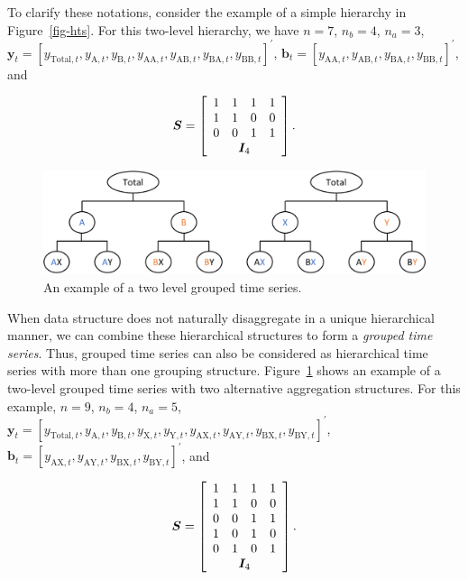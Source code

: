 \documentclass[11pt,a4paper,]{article}
\begin{document}
To clarify these notations, consider the example of a simple hierarchy
in Figure~\ref{fig-hts}. For this two-level hierarchy, we have
\(n = 7\), \(n_b = 4\), \(n_a = 3\),
\(\boldsymbol{y}_t = [y_{\text{Total},t}, y_{\text{A},t}, y_{\text{B},t}, y_{\text{AA},t}, y_{\text{AB},t}, y_{\text{BA},t}, y_{\text{BB},t}]^{\prime}\),
\(\boldsymbol{b}_t = [y_{\text{AA},t}, y_{\text{AB},t}, y_{\text{BA},t}, y_{\text{BB},t}]^{\prime}\),
and

\[
\boldsymbol{S} = \left[
\begin{array}{cccc}
1 & 1 & 1 & 1 \\
1 & 1 & 0 & 0 \\
0 & 0 & 1 & 1 \\
\multicolumn{4}{c}{\boldsymbol{I}_4}
\end{array}\right].
\]

\begin{figure}

{\centering \includegraphics[width=1\textwidth,height=\textheight]{figs/gts_example.pdf}

}

\caption{\label{fig-gts}An example of a two level grouped time series.}

\end{figure}

When data structure does not naturally disaggregate in a unique
hierarchical manner, we can combine these hierarchical structures to
form a \emph{grouped time series}. Thus, grouped time series can also be
considered as hierarchical time series with more than one grouping
structure. Figure~\ref{fig-gts} shows an example of a two-level grouped
time series with two alternative aggregation structures. For this
example, \(n = 9\), \(n_b = 4\), \(n_a = 5\),
\(\boldsymbol{y}_t = [y_{\text{Total},t}, y_{\text{A},t}, y_{\text{B},t}, y_{\text{X},t}, y_{\text{Y},t}, y_{\text{AX},t}, y_{\text{AY},t}, y_{\text{BX},t}, y_{\text{BY},t}]^{\prime}\),
\(\boldsymbol{b}_t = [y_{\text{AX},t}, y_{\text{AY},t}, y_{\text{BX},t}, y_{\text{BY},t}]^{\prime}\),
and

\[
\boldsymbol{S} = \left[
\begin{array}{cccc}
1 & 1 & 1 & 1 \\
1 & 1 & 0 & 0 \\
0 & 0 & 1 & 1 \\
1 & 0 & 1 & 0 \\
0 & 1 & 0 & 1 \\
\multicolumn{4}{c}{\boldsymbol{I}_4}
\end{array}\right].
\]
\end{document}
